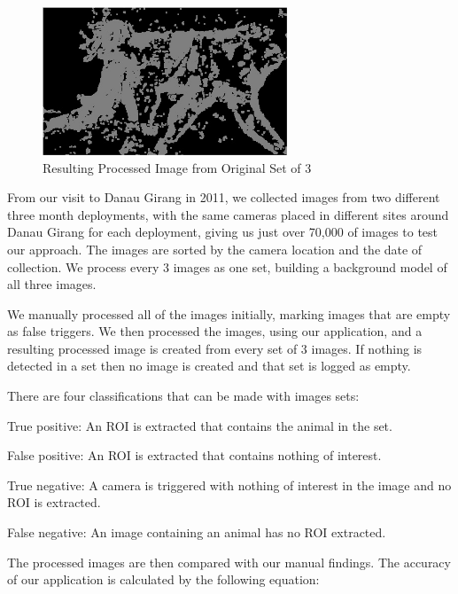 			\begin{figure}[h]
			\centering
			\includegraphics[width=0.65\textwidth]{Chap3/figures/PROC_IMG_0568}
			\caption{Resulting Processed Image from Original Set of 3}
			\label{tech:reconyx:processed}
			\end{figure}
	
		From our visit to Danau Girang in 2011, we collected images from two different three month deployments, with the same cameras placed in different sites around Danau Girang for each deployment, giving us just over 70,000 of images to test our approach. The images are sorted by the camera location and the date of collection. We process every 3 images as one set, building a background model of all three images.
		
		We manually processed all of the images initially, marking images that are empty as false triggers. We then processed the images, using our application, and a resulting processed image is created from every set of 3 images. If nothing is detected in a set then no image is created and that set is logged as empty. 
		
		There are four classifications that can be made with images sets:
		\begin{description}
			\item True positive: An ROI is extracted that contains the animal in the set.
			\item False positive: An ROI is extracted that contains nothing of interest.
			\item True negative: A camera is triggered with nothing of interest in the image and no ROI is extracted.
			\item False negative: An image containing an animal has no ROI extracted.
		\end{description}
		
		The processed images are then compared with our manual findings. The accuracy of our application is calculated by the following equation:
		
